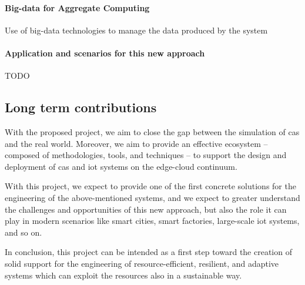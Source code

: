 \documentclass[12pt]{article}
\newcommand{\meta}[1]{{\color{blue}#1}}
\begin{document}
\paragraph{Big-data for Aggregate Computing}
\meta{
Use of big-data technologies to manage the data produced by the system

}

\paragraph{Application and scenarios for this new approach}
\meta{TODO}

\subsection{Long term contributions}
\meta{
With the proposed project, we aim to close the gap between the simulation of \ac{cas} and the real world.
%
Moreover, we aim to provide an effective ecosystem -- composed of methodologies, tools, and techniques --
to support the design and deployment of \ac{cas} and \ac{iot} systems on the edge-cloud continuum.

With this project,
we expect to provide one of the first concrete solutions for the engineering of the above-mentioned systems,
and we expect to greater understand the challenges and opportunities of this new approach,
but also the role it can play in modern scenarios like smart cities, smart factories, large-scale \ac{iot} systems, and so on.

In conclusion,
this project can be intended as a first step toward the creation of solid support
for the engineering of resource-efficient, resilient, and adaptive systems
which can exploit the resources also in a sustainable way.
}

\newpage

\printbibliography
\end{document}
